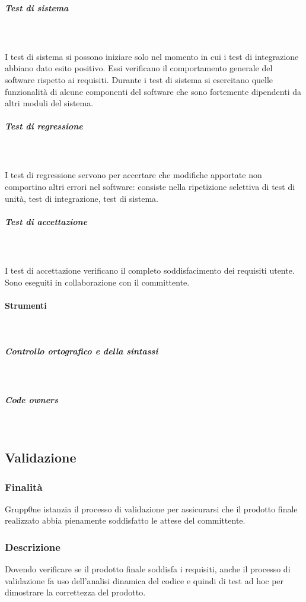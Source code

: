 \documentclass[../norme-di-progetto.tex]{subfiles}
\begin{document}
\subparagraph{Test di sistema}\mbox{}\\
\label{test di sistemaa}
\\ I test di sistema si possono iniziare solo nel momento in cui i test di integrazione abbiano dato esito positivo. Essi verificano il comportamento generale del software rispetto ai requisiti. Durante i test di sistema si esercitano quelle funzionalità di alcune componenti del software che sono fortemente dipendenti da altri moduli del sistema.
\subparagraph{Test di regressione}\mbox{}\\
\label{test di regressione}
\\I test di regressione servono per accertare che modifiche apportate non comportino altri errori nel software: consiste nella ripetizione selettiva di test di unità, test di integrazione, test di sistema.
\subparagraph{Test di accettazione}\mbox{}\\
\label{test di accettazione}
\\I test di accettazione verificano il completo soddisfacimento dei requisiti utente. Sono eseguiti in collaborazione con il committente.
\paragraph{Strumenti}\mbox{}\\
\label{par:strumenti}
\subparagraph{Controllo ortografico e della sintassi}\mbox{}\\
\label{subp:controllo ortografico e della sintassi}
\subparagraph{Code owners}\mbox{}\\
\label{subp:code owners}
\subsection{Validazione}
\label{sub:validazione}
\subsubsection{Finalità}
\label{subs:finalità}
Grupp0ne istanzia il processo di validazione per assicurarsi che il prodotto finale realizzato abbia pienamente soddisfatto le attese del committente.
\subsubsection{Descrizione}
\label{subs:descrizione}
Dovendo verificare se il prodotto finale soddisfa i requisiti, anche il processo di validazione fa uso dell'analisi dinamica del codice e quindi di test ad hoc per dimostrare la correttezza del prodotto.
\end{document}
